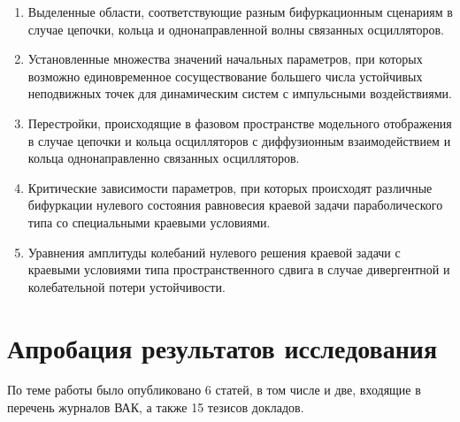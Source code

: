 \documentclass[12pt]{extarticle}
\begin{document}
\begin{enumerate}[label=\arabic*),leftmargin=1.5\parindent]
\item Выделенные области, соответствующие разным бифуркационным сценариям в случае цепочки, кольца и однонаправленной волны связанных осцилляторов.
\item Установленные множества значений начальных параметров, при которых возможно единовременное сосуществование большего числа устойчивых неподвижных точек для динамическим систем с импульсными воздействиями.
\item Перестройки, происходящие в фазовом пространстве модельного отображения в случае цепочки и кольца осцилляторов с диффузионным взаимодействием и кольца однонаправленно связанных осцилляторов.
\item Критические зависимости параметров, при которых происходят различные бифуркации нулевого состояния равновесия краевой задачи параболического типа со специальными краевыми условиями.
\item Уравнения амплитуды колебаний нулевого решения краевой задачи с краевыми условиями типа пространственного сдвига в случае дивергентной и колебательной потери устойчивости.
\end{enumerate}

\hspace{0cm}

\hspace{0cm}

\hspace{0cm}

\section*{Апробация результатов исследования}

\hspace{0cm}

\hspace{0cm}

\hspace{0cm}

По теме работы было опубликовано 6 статей, в том числе и две, входящие в перечень журналов ВАК, а также 15 тезисов докладов. 
\end{document}
